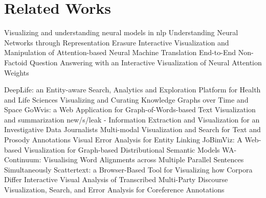 \section{Related Works}


Visualizing and understanding neural models in nlp
Understanding Neural Networks through Representation Erasure
Interactive Visualization and Manipulation of Attention-based Neural Machine Translation
End-to-End Non-Factoid Question Answering with an Interactive Visualization of Neural Attention Weights

DeepLife: an Entity-aware Search, Analytics and Exploration Platform for Health and Life Sciences
Visualizing and Curating Knowledge Graphs over Time and Space
GoWvis: a Web Application for Graph-of-Words-based Text Visualization and summarization
new/s/leak - Information Extraction and Visualization for an Investigative Data Journalists
Multi-modal Visualization and Search for Text and Prosody Annotations
Visual Error Analysis for Entity Linking
JoBimViz: A Web-based Visualization for Graph-based Distributional Semantic Models
WA-Continuum: Visualising Word Alignments across Multiple Parallel Sentences Simultaneously
Scattertext: a Browser-Based Tool for Visualizing how Corpora Differ
Interactive Visual Analysis of Transcribed Multi-Party Discourse
Visualization, Search, and Error Analysis for Coreference Annotations
